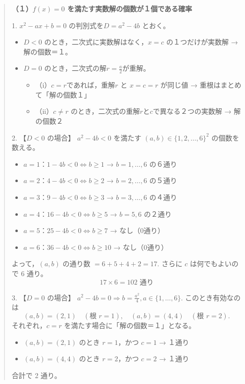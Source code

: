 \documentclass[a4j,uplatex]{jsarticle}
\newenvironment{dialogue}
{%
    \begin{quote}
        \setlength{\parskip}{0.5em}
        \setlength{\parindent}{0em}
        }
        {%
    \end{quote}
}
\theoremstyle{definition}
\begin{document}
\begin{dialogue}
{        \textbf{（１）$f(x)=0$ を満たす実数解の個数が１個である確率}

        1. $x^2-ax+b=0$ の判別式を$D=a^2-4b$ とおく。
        \begin{itemize}
            \item $D<0$ のとき，二次式に実数解はなく，$x=c$ の１つだけが実数解 → 解の個数＝１。
            \item $D=0$ のとき，二次式の解$r=\frac{a}{2}$が重解。
                  \begin{itemize}
                      \item （i）$c=r$であれば，重解$r$ と $x=c=r$ が同じ値 → 重根はまとめて「解の個数１」
                      \item （ii）$c\neq r$ のとき，二次式の重解$r$と$c$で異なる２つの実数解 → 解の個数２
                  \end{itemize}
        \end{itemize}

        2. 【$D<0$ の場合】
        $a^2-4b<0$ を満たす $(a,b)\in\{1,2,\dots,6\}^2$ の個数を数える。
        \begin{itemize}
            \item $a=1$：$1-4b<0 \iff b\ge1$ → $b=1,\dots,6$ の６通り
            \item $a=2$：$4-4b<0 \iff b\ge2$ → $b=2,\dots,6$ の５通り
            \item $a=3$：$9-4b<0 \iff b\ge3$ → $b=3,\dots,6$ の４通り
            \item $a=4$：$16-4b<0 \iff b\ge5$ → $b=5,6$ の２通り
            \item $a=5$：$25-4b<0 \iff b\ge7$ → なし（0通り）
            \item $a=6$：$36-4b<0 \iff b\ge10$ → なし（0通り）
        \end{itemize}
        よって，$(a,b)$ の通り数 $= 6+5+4+2=17.$
        さらに $c$ は何でもよいので 6 通り。
        $$17\times6 = 102 \text{ 通り}$$

        3. 【$D=0$ の場合】
        $a^2-4b=0\Longrightarrow b=\frac{a^2}{4}, a\in\{1,\dots,6\}.$
        このとき有効なのは
        $$(a,b)=(2,1)\quad(\text{根 }r=1),\quad (a,b)=(4,4)\quad(\text{根 }r=2).$$
        それぞれ，$c=r$ を満たす場合に「解の個数＝１」となる。
        \begin{itemize}
            \item $(a,b)=(2,1)$ のとき $r=1$，かつ $c=1$ → １通り
            \item $(a,b)=(4,4)$ のとき $r=2$，かつ $c=2$ → １通り
        \end{itemize}
        合計で 2 通り。

}
\end{dialogue}
\end{document}

